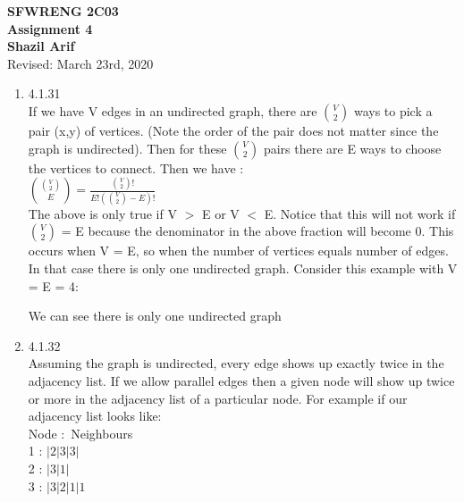 \documentclass[11pt,fleqn]{article}
\begin{document}
\begin{center}

  {\large \textbf{SFWRENG 2C03}}\\[2mm]
  {\huge \textbf{Assignment 4}}\\[6mm]
  {\large \textbf{Shazil Arif}}\\[2mm]
  {\large Revised: March 23rd, 2020}

\end{center}

\begin{enumerate}
\item 4.1.31\\
If we have V edges in an undirected graph, there are ${V \choose 2}$ ways to pick a pair (x,y) of vertices. (Note the order of the pair does not matter since the graph is undirected). Then for these ${V \choose 2}$ pairs there are E ways to choose the vertices to connect. Then we have :\\
${{V \choose 2} \choose E} = \frac{{V \choose 2}!}{E!({V \choose 2} - E)!}$\\

The above is only true if V $>$ E or V $<$ E. Notice that this will not work if ${V \choose 2}$ = E because the denominator in the above fraction will become 0. This occurs when V = E, so when the number of vertices equals number of edges. In that case there is only one undirected graph. Consider this example with V = E = 4:\\


\begin{center}
\end{center}

We can see there is only one undirected graph

\item 4.1.32\\
Assuming the graph is undirected, every edge shows up exactly twice in the adjacency list. If we allow parallel edges then a given node will show up twice or more in the adjacency list of a particular node. For example if our adjacency list looks like:\\
Node $:$ Neighbours\\
1 : $|2 | 3 | 3|$\\
2 : $|3 | 1 |$\\  
3 : $|3 | 2 | 1 | 1$\\


\end{enumerate}
\end{document}
